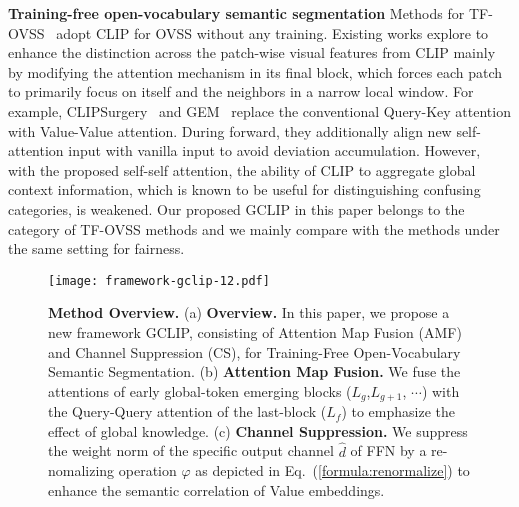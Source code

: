\noindent \textbf{Training-free open-vocabulary semantic segmentation}
Methods for TF-OVSS~\cite{MaskCLIP,CLIPSurgery,SCLIP,CLIPtrase,ClearCLIP} adopt CLIP for OVSS without any training.
Existing works explore to enhance the distinction across the patch-wise visual features from CLIP mainly by modifying the attention mechanism in its final block, which forces each patch to primarily focus on itself and the neighbors in a narrow local window.
For example, CLIPSurgery~\cite{CLIPSurgery} and GEM~\cite{GEM} replace the conventional Query-Key attention with Value-Value attention. During forward, 
they additionally align new self-attention input with vanilla input to avoid deviation accumulation.
However, with the proposed self-self attention, the ability of CLIP to aggregate global context information, which is known to be useful for distinguishing confusing categories, is weakened.
Our proposed GCLIP in this paper belongs to the category of TF-OVSS methods and we mainly compare with the methods under the same setting for fairness.


\begin{figure*}
  \centering
\texttt{[image: framework-gclip-12.pdf]}
  \caption{\textbf{Method Overview.} 
  (a) \textbf{Overview.} In this paper, we propose a new framework GCLIP, consisting of Attention Map Fusion (AMF) and Channel Suppression (CS), for Training-Free Open-Vocabulary Semantic Segmentation. 
  (b) \textbf{Attention Map Fusion.} We fuse the attentions of early global-token emerging blocks ($L_g$,$L_{g+1}$, $\cdots$) with the Query-Query attention of the last-block ($L_{f}$) to emphasize the effect of global knowledge.
  (c) \textbf{Channel Suppression.} We suppress the weight norm of the specific output channel $\hat{d}$ of FFN by a re-nomalizing operation $\varphi$ as depicted in Eq.~(\ref{formula:renormalize}) to enhance the semantic correlation of Value embeddings.}
\label{method_fig}
\end{figure*}
